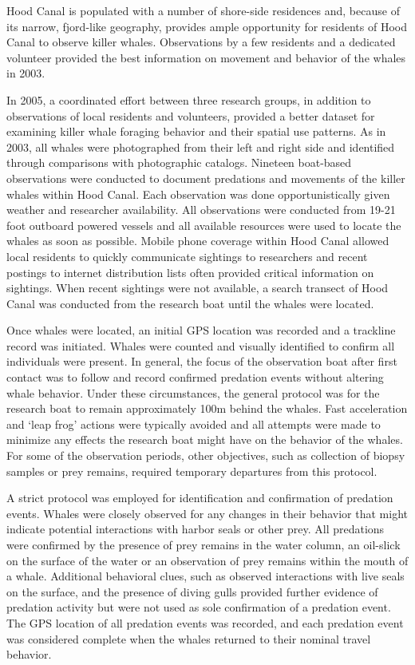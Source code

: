 Hood Canal is populated with a number of shore-side residences and,
because of its narrow, fjord-like geography, provides ample opportunity
for residents of Hood Canal to observe killer whales. Observations by a
few residents and a dedicated volunteer provided the best information on
movement and behavior of the whales in 2003.

In 2005, a coordinated effort between three research groups, in addition
to observations of local residents and volunteers, provided a better
dataset for examining killer whale foraging behavior and their spatial
use patterns. As in 2003, all whales were photographed from their left
and right side and identified through comparisons with photographic
catalogs. Nineteen boat-based observations were conducted to document
predations and movements of the killer whales within Hood Canal. Each
observation was done opportunistically given weather and researcher
availability. All observations were conducted from 19-21 foot outboard
powered vessels and all available resources were used to locate the
whales as soon as possible. Mobile phone coverage within Hood Canal
allowed local residents to quickly communicate sightings to researchers
and recent postings to internet distribution lists often provided
critical information on sightings. When recent sightings were not
available, a search transect of Hood Canal was conducted from the
research boat until the whales were located.

Once whales were located, an initial GPS location was recorded and a
trackline record was initiated. Whales were counted and visually
identified to confirm all individuals were present. In general, the
focus of the observation boat after first contact was to follow and
record confirmed predation events without altering whale behavior. Under
these circumstances, the general protocol was for the research boat to
remain approximately 100m behind the whales. Fast acceleration and `leap
frog' actions were typically avoided and all attempts were made to
minimize any effects the research boat might have on the behavior of the
whales. For some of the observation periods, other objectives, such as
collection of biopsy samples or prey remains, required temporary
departures from this protocol.

A strict protocol was employed for identification and confirmation of
predation events. Whales were closely observed for any changes in their
behavior that might indicate potential interactions with harbor seals or
other prey. All predations were confirmed by the presence of prey
remains in the water column, an oil-slick on the surface of the water or
an observation of prey remains within the mouth of a whale. Additional
behavioral clues, such as observed interactions with live seals on the
surface, and the presence of diving gulls provided further evidence of
predation activity but were not used as sole confirmation of a predation
event. The GPS location of all predation events was recorded, and each
predation event was considered complete when the whales returned to
their nominal travel behavior.

